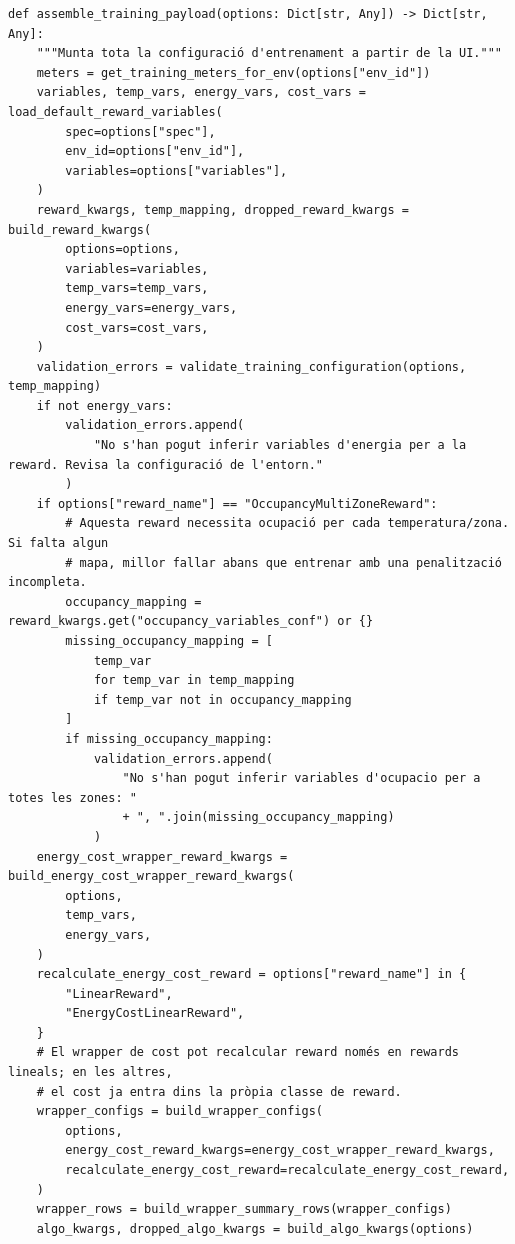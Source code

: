 \documentclass[10pt,a4paper]{article}
\begin{document}
\begin{lstlisting}[style=studioPython,caption={backend/entrenar\_agent\_rewards.py},label={lst:backend-entrenar-agent-rewards-py}]
def assemble_training_payload(options: Dict[str, Any]) -> Dict[str, Any]:
    """Munta tota la configuració d'entrenament a partir de la UI."""
    meters = get_training_meters_for_env(options["env_id"])
    variables, temp_vars, energy_vars, cost_vars = load_default_reward_variables(
        spec=options["spec"],
        env_id=options["env_id"],
        variables=options["variables"],
    )
    reward_kwargs, temp_mapping, dropped_reward_kwargs = build_reward_kwargs(
        options=options,
        variables=variables,
        temp_vars=temp_vars,
        energy_vars=energy_vars,
        cost_vars=cost_vars,
    )
    validation_errors = validate_training_configuration(options, temp_mapping)
    if not energy_vars:
        validation_errors.append(
            "No s'han pogut inferir variables d'energia per a la reward. Revisa la configuració de l'entorn."
        )
    if options["reward_name"] == "OccupancyMultiZoneReward":
        # Aquesta reward necessita ocupació per cada temperatura/zona. Si falta algun
        # mapa, millor fallar abans que entrenar amb una penalització incompleta.
        occupancy_mapping = reward_kwargs.get("occupancy_variables_conf") or {}
        missing_occupancy_mapping = [
            temp_var
            for temp_var in temp_mapping
            if temp_var not in occupancy_mapping
        ]
        if missing_occupancy_mapping:
            validation_errors.append(
                "No s'han pogut inferir variables d'ocupacio per a totes les zones: "
                + ", ".join(missing_occupancy_mapping)
            )
    energy_cost_wrapper_reward_kwargs = build_energy_cost_wrapper_reward_kwargs(
        options,
        temp_vars,
        energy_vars,
    )
    recalculate_energy_cost_reward = options["reward_name"] in {
        "LinearReward",
        "EnergyCostLinearReward",
    }
    # El wrapper de cost pot recalcular reward només en rewards lineals; en les altres,
    # el cost ja entra dins la pròpia classe de reward.
    wrapper_configs = build_wrapper_configs(
        options,
        energy_cost_reward_kwargs=energy_cost_wrapper_reward_kwargs,
        recalculate_energy_cost_reward=recalculate_energy_cost_reward,
    )
    wrapper_rows = build_wrapper_summary_rows(wrapper_configs)
    algo_kwargs, dropped_algo_kwargs = build_algo_kwargs(options)


\end{lstlisting}
\end{document}
